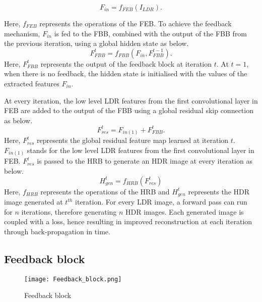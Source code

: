 \documentclass[conference]{IEEEtran}
\begin{document}
\begin{equation}
F_{in} = f_{FEB}(I_{LDR})\label{eq}.
\end{equation}

Here, $f_{FEB}$ represents the operations of the FEB.
To achieve the feedback mechanism, $F_{in}$ is fed to the FBB, combined with the output of the FBB from the previous iteration, using a global hidden state as below. 
\begin{equation}
F^t_{FBB} = f_{FBB}(F_{in}, F^{t-1}_{FBB}).\label{eq}
\end{equation}
Here, $F^t_{FBB}$ represents the output of the feedback block at iteration $t$. At $t=1$, when there is no feedback, the hidden state is initialised with the values of the extracted features $F_{in}$.

At every iteration, the low level LDR features from the first convolutional layer in FEB are added to the output of the FBB using a global residual skip connection as below.
\begin{equation}
F^t_{res} = F_{in(1)}+ F_{FBB}^t\label{eq}.
\end{equation}
Here, $F^t_{res}$ represents the global residual feature map learned at iteration $t$. $F_{in(1)}$ stands for the low level LDR features from the first convolutional layer in FEB. $F^t_{res}$ is passed to the HRB to generate an HDR image at every iteration as below.
\begin{equation}
H^t_{gen} = f_{HRB}(F^t_{res})\label{eq}
\end{equation}
Here, $f_{HRB}$ represents the operations of the HRB and $H^t_{gen}$ represents the HDR image generated at $t^{th}$ iteration.
For every LDR image, a forward pass can run for $n$ iterations, therefore generating $n$ HDR images. Each generated image is coupled with a loss, hence resulting in improved reconstruction at each iteration through back-propagation in time.

\subsection{Feedback block}

\begin{figure}[htbp]
\centering
\texttt{[image: Feedback\_block.png]}
\caption{Feedback block}
\label{fig2}
\end{figure}
\end{document}
